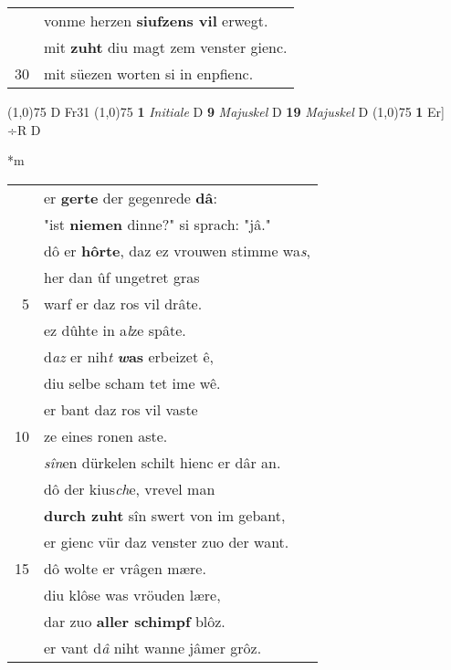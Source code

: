 \documentclass[8pt,a4paper,notitlepage]{article}
\begin{document}
\begin{table}[ht]
\begin{minipage}[t]{0.5\linewidth}
\begin{tabular}{rl}
 & vonme herzen \textbf{siufzens vil} erwegt.\\ 
 & mit \textbf{zuht} diu magt zem venster gienc.\\ 
30 & mit süezen worten si in enpfienc.\\ 
\end{tabular}
\scriptsize
\line(1,0){75} \newline
D Fr31 \newline
\line(1,0){75} \newline
\textbf{1} \textit{Initiale} D  \textbf{9} \textit{Majuskel} D  \textbf{19} \textit{Majuskel} D  \newline
\line(1,0){75} \newline
\textbf{1} Er] ÷R D \newline
\end{minipage}
\hspace{0.5cm}
\begin{minipage}[t]{0.5\linewidth}
\small
\begin{center}*m
\end{center}
\begin{tabular}{rl}
 & er \textbf{gerte} der gegenrede \textbf{dâ}:\\ 
 & "ist \textbf{niemen} dinne?" si sprach: "jâ."\\ 
 & dô er \textbf{hôrte}, daz ez vrouwen stimme wa\textit{s},\\ 
 & her dan ûf ungetret gras\\ 
5 & warf er daz ros vil drâte.\\ 
 & ez dûhte in a\textit{l}ze spâte.\\ 
 & d\textit{az} er nih\textit{t} \textbf{\textit{w}as} erbeizet ê,\\ 
 & diu selbe scham tet ime wê.\\ 
 & er bant daz ros vil vaste\\ 
10 & ze eines ronen aste.\\ 
 & \textit{sîn}en dürkelen schilt hienc er dâr an.\\ 
 & dô der kius\textit{ch}e, vrevel man\\ 
 & \textbf{durch zuht} sîn swert von im gebant,\\ 
 & er gienc vür daz venster zuo der want.\\ 
15 & dô wolte er vrâgen mære.\\ 
 & diu klôse was vröuden lære,\\ 
 & dar zuo \textbf{aller schimpf} blôz.\\ 
 & er vant d\textit{â} niht wanne jâmer grôz.\\ 

\end{tabular}
\end{minipage}
\end{table}
\end{document}
